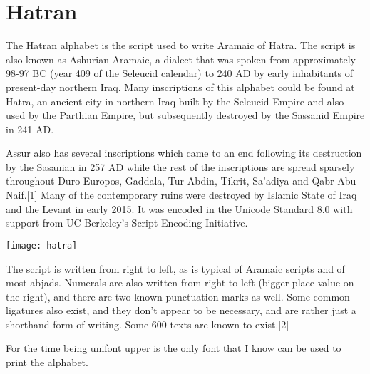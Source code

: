 \section{Hatran}


The Hatran alphabet is the script used to write Aramaic of Hatra. The script is also known as Ashurian Aramaic, a dialect that was spoken from approximately 98-97 BC (year 409 of the Seleucid calendar) to 240 AD by early inhabitants of present-day northern Iraq. Many inscriptions of this alphabet could be found at Hatra, an ancient city in northern Iraq built by the Seleucid Empire and also used by the Parthian Empire, but subsequently destroyed by the Sassanid Empire in 241 AD. 

Assur also has several inscriptions which came to an end following its destruction by the Sasanian in 257 AD while the rest of the inscriptions are spread sparsely throughout Duro-Europos, Gaddala, Tur Abdin, Tikrit, Sa'adiya and Qabr Abu Naif.[1] Many of the contemporary ruins were destroyed by Islamic State of Iraq and the Levant in early 2015. It was encoded in the Unicode Standard 8.0 with support from UC Berkeley's Script Encoding Initiative.


\texttt{[image: hatra]}

The script is written from right to left, as is typical of Aramaic scripts and of most abjads. Numerals are also written from right to left (bigger place value on the right), and there are two known punctuation marks as well. Some common ligatures also exist, and they don't appear to be necessary, and are rather just a shorthand form of writing. Some 600 texts are known to exist.[2]

\newfontfamily{}


For the time being unifont upper is the only font that I know can be used to print the alphabet.

